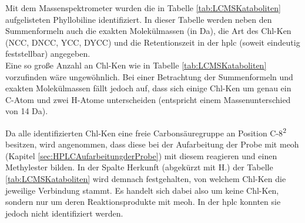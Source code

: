 Mit dem Massenspektrometer wurden die in Tabelle \ref{tab:LCMSKataboliten} aufgelisteten Phyllobiline identifiziert. In dieser Tabelle werden neben den Summenformeln auch die exakten Molekülmassen (in Da), die Art des \gls{Chl-K}en (NCC, DNCC, YCC, DYCC) und die Retentionszeit in der \gls{hplc} (soweit eindeutig feststellbar) angegeben. \\

Eine so große Anzahl an \gls{Chl-K}en wie in Tabelle \ref{tab:LCMSKataboliten} vorzufinden wäre ungewöhnlich. Bei einer Betrachtung der Summenformeln und exakten Molekülmassen fällt jedoch auf, dass sich einige \gls{Chl-K}en um genau ein C-Atom und zwei H-Atome unterscheiden (entspricht einem Massenunterschied von 14 Da). 

Da alle identifizierten \gls{Chl-K}en eine freie Carbonsäuregruppe an Position C-8\textsuperscript{2} besitzen, wird angenommen, dass diese bei der Aufarbeitung der Probe mit \gls{meoh} (Kapitel \ref{sec:HPLCAufarbeitungderProbe}) mit diesem reagieren und einen Methylester bilden. In der Spalte Herkunft (abgekürzt mit H.) der Tabelle \ref{tab:LCMSKataboliten} wird demnach festgehalten, von welchem \gls{Chl-K}en die jeweilige Verbindung stammt. Es handelt sich dabei also um keine \gls{Chl-K}en, sondern nur um deren Reaktionsprodukte mit \gls{meoh}. In der \gls{hplc} konnten sie jedoch nicht identifiziert werden. \\

